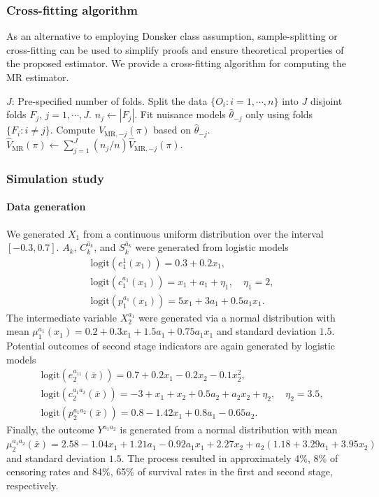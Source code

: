 \documentclass{article}
\newcommand{\wh}{\widehat}
\begin{document}
\subsubsection{Cross-fitting algorithm}
%
As an alternative to employing Donsker class assumption, sample-splitting or cross-fitting can be used to simplify proofs and ensure theoretical properties of the proposed estimator. We provide a cross-fitting algorithm for computing the MR estimator.
\begin{algorithm} \small \caption{Compute $\wh V_\text{MR}(\pi)$ via cross-fitting.} \label{alg:MR-samplesplit}
\begin{algorithmic}[1]
	\State $J$: Pre-specified number of folds.
	\State Split the data $\{O_i: i=1,\cdots,n\}$ into $J$ disjoint folds $F_j$, $j=1,\cdots,J$.
	  \State $n_j \gets |F_j|$.
	  \State Fit nuisance models $\hat\theta_{-j}$ only using folds $\{ F_i: i \ne j\}$.
	  \State Compute $\wh V_{\text{MR},-j}(\pi)$ based on $\hat\theta_{-j}$.
	\EndFor
	\State $\wh V_\text{MR}(\pi) \gets \sum_{j=1}^J ({n_j}/{n}) \wh V_{\text{MR},-j}(\pi).$
\end{algorithmic}
\end{algorithm}

%
\subsubsection{Simulation study} 
\label{A:sim}
\paragraph{Data generation} We generated $X_1$ from a continuous uniform distribution over the interval $[-0.3, 0.7]$. $A_k$, $C_k^{\bar{a}_k}$, and $S_k^{\bar{a}_k}$ were generated from logistic models
\begin{gather}
	\text{logit}(e_1^1(x_1))=0.3 + 0.2x_1, \label{eq:dgp1} \\
	\text{logit}(c_1^{a_1}(x_1))=x_1 + a_1 + \eta_1, \quad \eta_1=2, \\
	\text{logit}(p_1^{a_1}(x_1))=5x_1 + 3a_1 + 0.5a_1x_1.
\end{gather}
The intermediate variable $X_2^{a_1}$ were generated via a normal distribution with mean $\mu_1^{a_1}(x_1) = 0.2 + 0.3x_1 + 1.5a_1 + 0.75a_1x_1$ and standard deviation $1.5$. 
Potential outcomes of second stage indicators are again generated by logistic models
\begin{gather}
	\text{logit}(e_2^{a_11}(\bar x))=0.7 + 0.2x_1 - 0.2x_2 -0.1 x_2^2, \\
	\text{logit}(c_2^{a_1a_2}(\bar x))=-3 + x_1 + x_2 + 0.5 a_2 + a_2x_2 + \eta_2, \quad \eta_2=3.5, \\
	\text{logit}(p_2^{a_1a_2}(\bar x))=0.8 - 1.42 x_1 + 0.8 a_1 - 0.65 a_2. \label{eq:dgp2}
\end{gather}
Finally, the outcome $Y^{a_1a_2}$ is generated from a normal distribution with mean $\mu_2^{a_1a_2}(\bar{x}) = 2.58 - 1.04x_1 + 1.21a_1 - 0.92a_1x_1 + 2.27x_2 + a_2(1.18 + 3.29a_1 + 3.95x_2)$ and standard deviation $1.5$.
The process resulted in approximately 4\%, 8\% of censoring rates and 84\%, 65\% of survival rates in the first and second stage, respectively.
\end{document}
